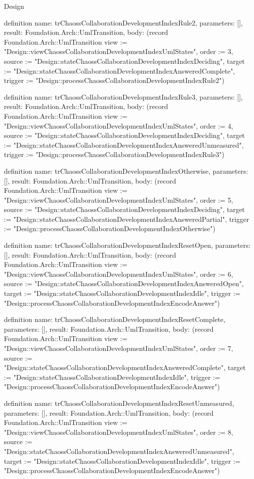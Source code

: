 \begin{lexlean}{Design}
\begin{semanticmodule}
definition{
  name: trChaossCollaborationDevelopmentIndexRule2,
  parameters: [],
  result: Foundation.Arch::UmlTransition,
  body: (record Foundation.Arch::UmlTransition {view := "Design::viewChaossCollaborationDevelopmentIndexUmlStates", order := 3, source := "Design::stateChaossCollaborationDevelopmentIndexDeciding", target := "Design::stateChaossCollaborationDevelopmentIndexAnsweredComplete", trigger := "Design::processChaossCollaborationDevelopmentIndexRule2"})
}

definition{
  name: trChaossCollaborationDevelopmentIndexRule3,
  parameters: [],
  result: Foundation.Arch::UmlTransition,
  body: (record Foundation.Arch::UmlTransition {view := "Design::viewChaossCollaborationDevelopmentIndexUmlStates", order := 4, source := "Design::stateChaossCollaborationDevelopmentIndexDeciding", target := "Design::stateChaossCollaborationDevelopmentIndexAnsweredUnmeasured", trigger := "Design::processChaossCollaborationDevelopmentIndexRule3"})
}

definition{
  name: trChaossCollaborationDevelopmentIndexOtherwise,
  parameters: [],
  result: Foundation.Arch::UmlTransition,
  body: (record Foundation.Arch::UmlTransition {view := "Design::viewChaossCollaborationDevelopmentIndexUmlStates", order := 5, source := "Design::stateChaossCollaborationDevelopmentIndexDeciding", target := "Design::stateChaossCollaborationDevelopmentIndexAnsweredPartial", trigger := "Design::processChaossCollaborationDevelopmentIndexOtherwise"})
}

definition{
  name: trChaossCollaborationDevelopmentIndexResetOpen,
  parameters: [],
  result: Foundation.Arch::UmlTransition,
  body: (record Foundation.Arch::UmlTransition {view := "Design::viewChaossCollaborationDevelopmentIndexUmlStates", order := 6, source := "Design::stateChaossCollaborationDevelopmentIndexAnsweredOpen", target := "Design::stateChaossCollaborationDevelopmentIndexIdle", trigger := "Design::processChaossCollaborationDevelopmentIndexEncodeAnswer"})
}

definition{
  name: trChaossCollaborationDevelopmentIndexResetComplete,
  parameters: [],
  result: Foundation.Arch::UmlTransition,
  body: (record Foundation.Arch::UmlTransition {view := "Design::viewChaossCollaborationDevelopmentIndexUmlStates", order := 7, source := "Design::stateChaossCollaborationDevelopmentIndexAnsweredComplete", target := "Design::stateChaossCollaborationDevelopmentIndexIdle", trigger := "Design::processChaossCollaborationDevelopmentIndexEncodeAnswer"})
}

definition{
  name: trChaossCollaborationDevelopmentIndexResetUnmeasured,
  parameters: [],
  result: Foundation.Arch::UmlTransition,
  body: (record Foundation.Arch::UmlTransition {view := "Design::viewChaossCollaborationDevelopmentIndexUmlStates", order := 8, source := "Design::stateChaossCollaborationDevelopmentIndexAnsweredUnmeasured", target := "Design::stateChaossCollaborationDevelopmentIndexIdle", trigger := "Design::processChaossCollaborationDevelopmentIndexEncodeAnswer"})
}


\end{semanticmodule}
\end{lexlean}
